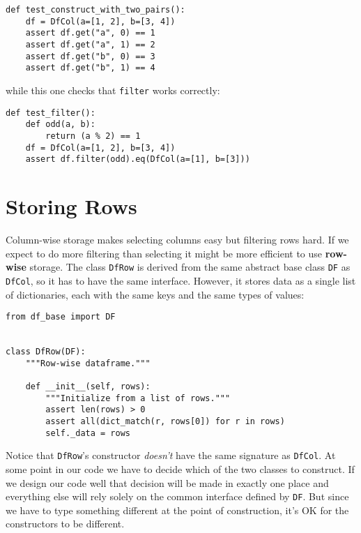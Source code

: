 \documentclass{scrbook}
\newcommand{\glossref}[1]{\textbf{#1}}
\begin{document}
\begin{lstlisting}[frame=single,frameround=tttt]
def test_construct_with_two_pairs():
    df = DfCol(a=[1, 2], b=[3, 4])
    assert df.get("a", 0) == 1
    assert df.get("a", 1) == 2
    assert df.get("b", 0) == 3
    assert df.get("b", 1) == 4
\end{lstlisting}



\noindent while this one checks that \texttt{filter} works correctly:


\begin{lstlisting}[frame=single,frameround=tttt]
def test_filter():
    def odd(a, b):
        return (a % 2) == 1
    df = DfCol(a=[1, 2], b=[3, 4])
    assert df.filter(odd).eq(DfCol(a=[1], b=[3]))
\end{lstlisting}


\section*{Storing Rows}


Column-wise storage makes selecting columns easy but filtering rows hard.
If we expect to do more filtering than selecting
it might be more efficient to use \glossref{row-wise} storage.
The class \texttt{DfRow} is derived from the same abstract base class \texttt{DF} as \texttt{DfCol},
so it has to have the same interface.
However,
it stores data as a single list of dictionaries,
each with the same keys and the same types of values:


\begin{lstlisting}[frame=single,frameround=tttt]
from df_base import DF


class DfRow(DF):
    """Row-wise dataframe."""

    def __init__(self, rows):
        """Initialize from a list of rows."""
        assert len(rows) > 0
        assert all(dict_match(r, rows[0]) for r in rows)
        self._data = rows
\end{lstlisting}



\noindent Notice that \texttt{DfRow}'s constructor \emph{doesn't} have the same signature as \texttt{DfCol}.
At some point in our code we have to decide which of the two classes to construct.
If we design our code well that decision will be made in exactly one place
and everything else will rely solely on the common interface defined by \texttt{DF}.
But since we have to type something different at the point of construction,
it's OK for the constructors to be different.
\end{document}

